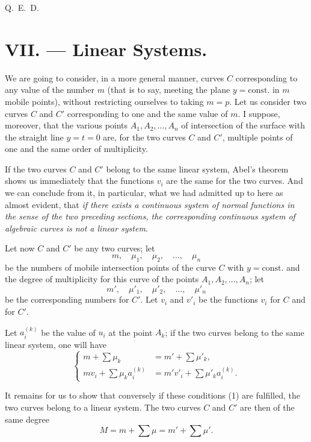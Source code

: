 \documentclass{article}
\begin{document}
Q.~E.~D.

\section*{VII. --- Linear Systems.}

We are going to consider, in a more general manner, curves $C$ corresponding to any value of the number $m$ (that is to say, meeting the plane $y = \mathrm{const.}$ in $m$ mobile points), without restricting ourselves to taking $m = p$. Let us consider two curves $C$ and $C'$ corresponding to one and the same value of $m$. I suppose, moreover, that the various points $A_{1}, A_{2}, \ldots, A_{n}$ of intersection of the surface with the straight line $y = t = 0$ are, for the two curves $C$ and $C'$, multiple points of one and the same order of multiplicity.

If the two curves $C$ and $C'$ belong to the same linear system, Abel's theorem shows us immediately that the functions $v_{i}$ are the same for the two curves. And we can conclude from it, in particular, what we had admitted up to here as almost evident, that \emph{if there exists a continuous system of normal functions in the sense of the two preceding sections, the corresponding continuous system of algebraic curves is not a linear system}.

Let now $C$ and $C'$ be any two curves; let
\[
m, \quad \mu_{1}, \quad \mu_{2}, \quad \ldots, \quad \mu_{n}
\]
be the numbers of mobile intersection points of the curve $C$ with $y = \mathrm{const.}$ and the degree of multiplicity for this curve of the points $A_{1}, A_{2}, \ldots, A_{n}$; let
\[
m', \quad \mu'_{1}, \quad \mu'_{2}, \quad \ldots, \quad \mu'_{n}
\]
be the corresponding numbers for $C'$. Let $v_{i}$ and $v'_{i}$ be the functions $v_{i}$ for $C$ and for $C'$.

Let $a_{i}^{(k)}$ be the value of $u_{i}$ at the point $A_{k}$; if the two curves belong to the same linear system, one will have
\[
\left\{
\begin{aligned}
m + \sum \mu_{k} &= m' + \sum \mu'_{k}, \\
m v_{i} + \sum \mu_{k} a_{i}^{(k)} &= m' v'_{i} + \sum \mu'_{k} a_{i}^{(k)}.
\end{aligned}
\right. \tag{1}
\]

It remains for us to show that conversely if these conditions (1)
are fulfilled, the two curves belong to a linear system.
The two curves $C$ and $C'$ are then of the same degree
\[
M = m + \sum \mu = m' + \sum \mu'.
\]
\end{document}
